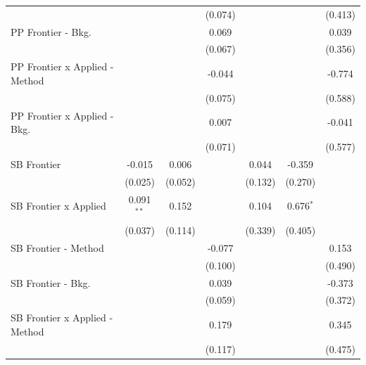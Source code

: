 \begin{tabular}{lcccccc}
                                  &               &           & (0.074)      &               &              & (0.413)\\   
   PP Frontier - Bkg.             &               &           & 0.069        &               &              & 0.039\\   
                                  &               &           & (0.067)      &               &              & (0.356)\\   
   PP Frontier x Applied - Method &               &           & -0.044       &               &              & -0.774\\   
                                  &               &           & (0.075)      &               &              & (0.588)\\   
   PP Frontier x Applied - Bkg.   &               &           & 0.007        &               &              & -0.041\\   
                                  &               &           & (0.071)      &               &              & (0.577)\\   
   SB Frontier                    & -0.015        & 0.006     &              & 0.044         & -0.359       &   \\   
                                  & (0.025)       & (0.052)   &              & (0.132)       & (0.270)      &   \\   
   SB Frontier x Applied          & 0.091$^{**}$  & 0.152     &              & 0.104         & 0.676$^{*}$  &   \\   
                                  & (0.037)       & (0.114)   &              & (0.339)       & (0.405)      &   \\   
   SB Frontier - Method           &               &           & -0.077       &               &              & 0.153\\   
                                  &               &           & (0.100)      &               &              & (0.490)\\   
   SB Frontier - Bkg.             &               &           & 0.039        &               &              & -0.373\\   
                                  &               &           & (0.059)      &               &              & (0.372)\\   
   SB Frontier x Applied - Method &               &           & 0.179        &               &              & 0.345\\   
                                  &               &           & (0.117)      &               &              & (0.475)\\   

\end{tabular}
